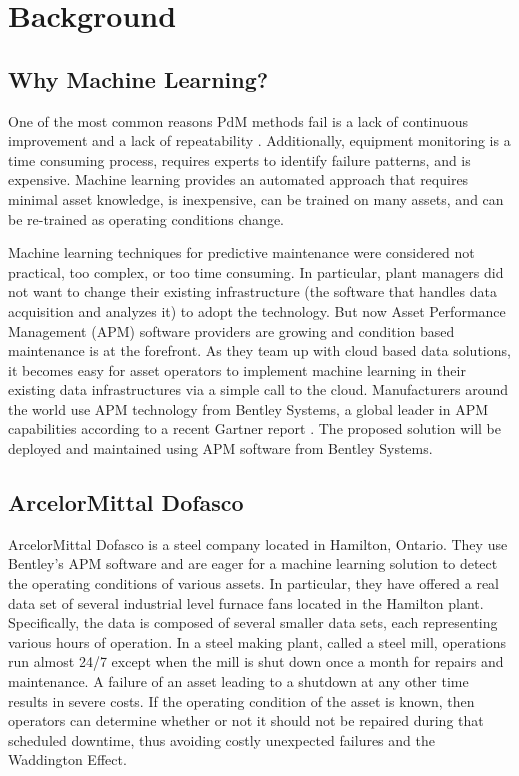 \section{Background} %

\subsection{Why Machine Learning?}
One of the most common reasons PdM methods fail is a lack of continuous improvement and a lack of repeatability \cite{whypdmfails}.
Additionally, equipment monitoring is a time consuming process, requires experts to identify failure patterns, and is expensive.
Machine learning provides an automated approach that requires minimal asset knowledge, is inexpensive, can be trained on many assets, and can be re-trained as operating conditions change.

Machine learning techniques for predictive maintenance were considered not practical, too complex, or too time consuming.
In particular, plant managers did not want to change their existing infrastructure (the software that handles data acquisition and analyzes it) to adopt the technology.
But now Asset Performance Management (APM) software providers are growing and condition based maintenance is at the forefront.
As they team up with cloud based data solutions, it becomes easy for asset operators to implement machine learning in their existing data infrastructures via a simple call to the cloud.
Manufacturers around the world use APM technology from Bentley Systems, a global leader in APM capabilities according to a recent Gartner report \cite{foust_steenstrup_2018}.
The proposed solution will be deployed and maintained using APM software from Bentley Systems.

\subsection{ArcelorMittal Dofasco}
ArcelorMittal Dofasco is a steel company located in Hamilton, Ontario.
They use Bentley's APM software and are eager for a machine learning solution to detect the operating conditions of various assets. 
In particular, they have offered a real data set of several industrial level furnace fans located in the Hamilton plant. 
Specifically, the data is composed of several smaller data sets, each representing various hours of operation.
In a steel making plant, called a steel mill, operations run almost 24/7 except when the mill is shut down once a month for repairs and maintenance.
A failure of an asset leading to a shutdown at any other time results in severe costs.
If the operating condition of the asset is known, then operators can determine whether or not it should not be repaired during that scheduled downtime,
thus avoiding costly unexpected failures and the Waddington Effect.


